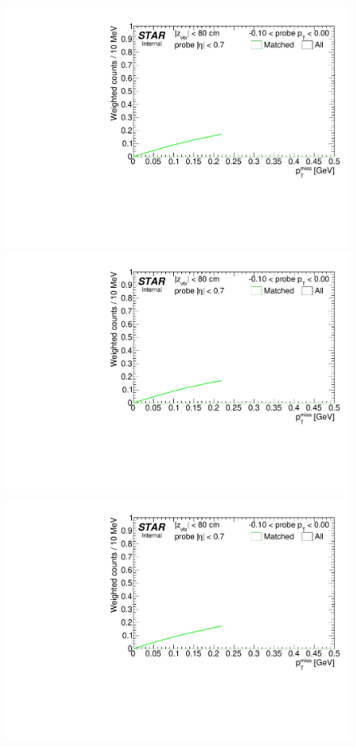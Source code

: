 \begin{figure}[h!]
{}~
\parbox{0.24\textwidth}{
  \centering
  \includegraphics[width=\linewidth,page=5]{graphics/correctionsToEff/TOF_tagAndProbe/Fitting_effVsPt_mc.CPT2.pdf}\\
  \includegraphics[width=\linewidth,page=7]{graphics/correctionsToEff/TOF_tagAndProbe/Fitting_effVsPt_mc.CPT2.pdf}\\
  \includegraphics[width=\linewidth,page=9]{graphics/correctionsToEff/TOF_tagAndProbe/Fitting_effVsPt_mc.CPT2.pdf}\\
}
\end{figure}
